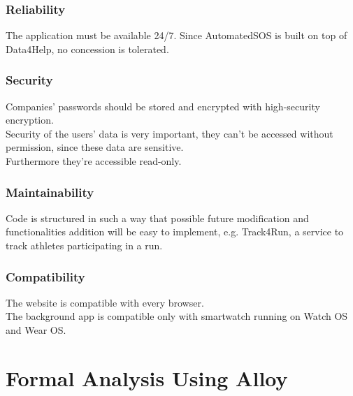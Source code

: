 \documentclass{article}
\begin{document}
\subsubsection{Reliability}
The application must be available 24/7. Since AutomatedSOS is built on top of Data4Help, no concession is tolerated.
\subsubsection{Security}
Companies' passwords should be stored and encrypted with high-security encryption. \\
Security of the users' data is very important, they can't be accessed without permission, since these data are sensitive. \\
Furthermore they're accessible read-only.
\subsubsection{Maintainability}
Code is structured in such a way that possible future modification and functionalities addition will be easy to implement, e.g. Track4Run, a service to track athletes participating in a run.
\subsubsection{Compatibility}
The website is compatible with every browser. \\
The background app is compatible only with smartwatch running on Watch OS and Wear OS.
\newpage
\section{Formal Analysis Using Alloy}
\end{document}
